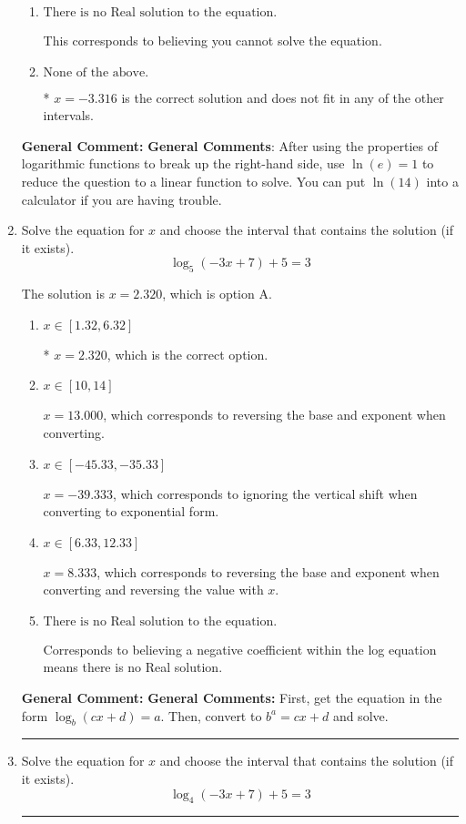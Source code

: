\documentclass{extbook}[14pt]
\newcommand{\litem}[1]{\item #1

\rule{\textwidth}{0.4pt}}
\begin{document}
\begin{enumerate}
{\begin{enumerate}[label=\Alph*.]
$x = -29.607$, which corresponds to thinking you don't need to take the natural log of both sides before reducing, as if the right side already has a natural log.
\item \( \text{There is no Real solution to the equation.} \)

This corresponds to believing you cannot solve the equation.
\item \( \text{None of the above.} \)

* $x = -3.316$ is the correct solution and does not fit in any of the other intervals.
\end{enumerate}

\textbf{General Comment:} \textbf{General Comments}: After using the properties of logarithmic functions to break up the right-hand side, use $\ln(e) = 1$ to reduce the question to a linear function to solve. You can put $\ln(14)$ into a calculator if you are having trouble.
}
\litem{
Solve the equation for $x$ and choose the interval that contains the solution (if it exists).
\[ \log_{5}{(-3x+7)}+5 = 3 \]

The solution is \( x = 2.320 \), which is option A.\begin{enumerate}[label=\Alph*.]
\item \( x \in [1.32, 6.32] \)

* $x = 2.320$, which is the correct option.
\item \( x \in [10, 14] \)

$x = 13.000$, which corresponds to reversing the base and exponent when converting.
\item \( x \in [-45.33, -35.33] \)

$x = -39.333$, which corresponds to ignoring the vertical shift when converting to exponential form.
\item \( x \in [6.33, 12.33] \)

$x = 8.333$, which corresponds to reversing the base and exponent when converting and reversing the value with $x$.
\item \( \text{There is no Real solution to the equation.} \)

Corresponds to believing a negative coefficient within the log equation means there is no Real solution.
\end{enumerate}

\textbf{General Comment:} \textbf{General Comments:} First, get the equation in the form $\log_b{(cx+d)} = a$. Then, convert to $b^a = cx+d$ and solve.
}
\litem{
Solve the equation for $x$ and choose the interval that contains the solution (if it exists).
\[ \log_{4}{(-3x+7)}+5 = 3 \]

}
\end{enumerate}
\end{document}
